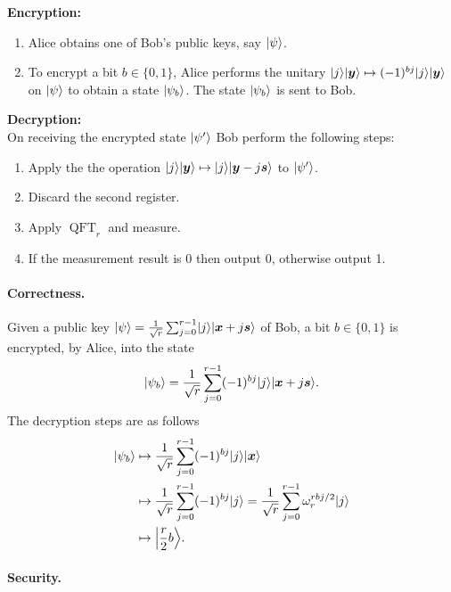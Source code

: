 \documentclass[11pt]{article}
\theoremstyle{plain}
\theoremstyle{definition}
\DeclareMathOperator{\qft}{QFT}
\DeclarePairedDelimiter{\ldbrac}{\lvert}{\rangle}
\begin{document}
\vspace*{5mm}

\textbf{Encryption:}
\begin{enumerate}[topsep = 1pt, itemsep = 1pt, parsep = 1pt]
\item Alice obtains one of Bob's public keys, say $\ldbrac{\psi}$.
\item To encrypt a bit $b \in \{ 0, 1 \}$, Alice performs the unitary $\ldbrac{j}\ldbrac{\bm{y}} \mapsto (-1)^{bj}\ldbrac{j}\ldbrac{\bm{y}}$ on $\ldbrac{\psi}$ to obtain a state $\ldbrac{\psi_b}$. The state $\ldbrac{\psi_b}$ is sent to Bob.
\end{enumerate}

\vspace*{5mm}

\textbf{Decryption:} \\
On receiving the encrypted state $\ldbrac{\psi'}$ Bob perform the following steps:
\begin{enumerate}[topsep = 1pt, itemsep = 1pt, parsep = 1pt]
\item Apply the the operation $\ldbrac{j}\ldbrac{\bm{y}} \mapsto \ldbrac{j}\ldbrac{\bm{y} - j\bm{s}}$ to $\ldbrac{\psi'}$.
\item Discard the second register.
\item Apply $\qft_r$ and measure.
\item If the measurement result is 0 then output 0, otherwise output 1.
\end{enumerate}

\paragraph{Correctness.} 
Given a public key $\ldbrac{\psi} = \frac{1}{\sqrt{r}} \sum_{j = 0}^{r - 1} \ldbrac{j} \ldbrac{\bm{x} + j\bm{s}}$ of Bob, a bit $b \in \{ 0, 1 \}$ is encrypted, by Alice, into the state
\[ \ldbrac{\psi_b} = \frac{1}{\sqrt{r}} \sum_{j = 0}^{r - 1} (-1)^{bj}\ldbrac{j} \ldbrac{\bm{x} + j\bm{s}}. \]
The decryption steps are as follows
\begin{align*}
    \ldbrac{\psi_b}
    & \mapsto \frac{1}{\sqrt{r}} \sum_{j = 0}^{r - 1} (-1)^{bj}\ldbrac{j} \ldbrac{\bm{x}} \\  
    & \mapsto \frac{1}{\sqrt{r}} \sum_{j = 0}^{r - 1} (-1)^{bj}\ldbrac{j} = \frac{1}{\sqrt{r}} \sum_{j = 0}^{r - 1} \omega_r^{rbj / 2}\ldbrac{j} \\
    & \mapsto \ldbrac*{\frac{r}{2}b}.
\end{align*}


\paragraph{Security.}




\end{document}
